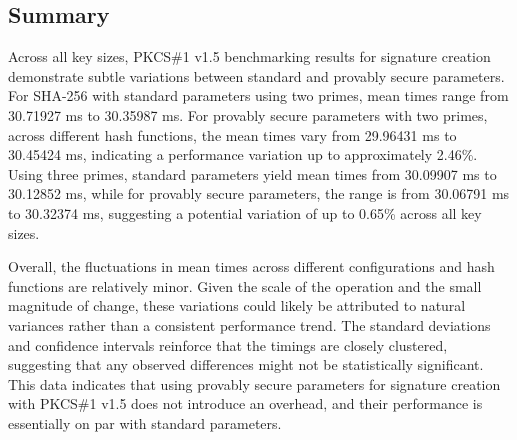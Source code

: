 \documentclass[]{final_report}
\theoremstyle{definition}
\begin{document}

\subsection*{Summary}


Across all key sizes, PKCS\#1 v1.5 benchmarking results for signature creation demonstrate subtle variations between standard and provably secure parameters. For SHA-256 with standard parameters using two primes, mean times range from 30.71927 ms to 30.35987 ms. For provably secure parameters with two primes, across different hash functions, the mean times vary from 29.96431 ms to 30.45424 ms, indicating a performance variation up to approximately 2.46\%. Using three primes, standard parameters yield mean times from 30.09907 ms to 30.12852 ms, while for provably secure parameters, the range is from 30.06791 ms to 30.32374 ms, suggesting a potential variation of up to 0.65\% across all key sizes. 

Overall, the fluctuations in mean times across different configurations and hash functions are relatively minor. Given the scale of the operation and the small magnitude of change, these variations could likely be attributed to natural variances rather than a consistent performance trend. The standard deviations and confidence intervals reinforce that the timings are closely clustered, suggesting that any observed differences might not be statistically significant. This data indicates that using provably secure parameters for signature creation with PKCS\#1 v1.5 does not introduce an overhead, and their performance is essentially on par with standard parameters.
\end{document}
